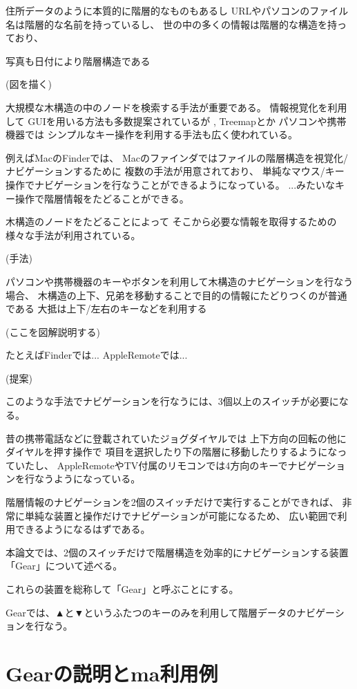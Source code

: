\documentclass[twoside]{wiss}
\def\▲{▲}
\def\▼{▼}
\begin{document}
住所データのように本質的に階層的なものもあるし
URLやパソコンのファイル名は階層的な名前を持っているし、
世の中の多くの情報は階層的な構造を持っており、

写真も日付により階層構造である

(図を描く)

大規模な木構造の中のノードを検索する手法が重要である。
情報視覚化を利用して
GUIを用いる方法も多数提案されているが
\cite{Johnson:1991:TSA:949607.949654},
  Treemapとか
パソコンや携帯機器では
シンプルなキー操作を利用する手法も広く使われている。

例えばMacのFinderでは、
Macのファインダではファイルの階層構造を視覚化/ナビゲーションするために
複数の手法が用意されており、
単純なマウス/キー操作でナビゲーションを行なうことができるようになっている。
...みたいなキー操作で階層情報をたどることができる。

木構造のノードをたどることによって
そこから必要な情報を取得するための様々な手法が利用されている。

(手法)

パソコンや携帯機器のキーやボタンを利用して木構造のナビゲーションを行なう場合、
木構造の上下、兄弟を移動することで目的の情報にたどりつくのが普通である
大抵は上下/左右のキーなどを利用する

(ここを図解説明する)

たとえばFinderでは... AppleRemoteでは...

(提案)

このような手法でナビゲーションを行なうには、3個以上のスイッチが必要になる。

昔の携帯電話などに登載されていたジョグダイヤルでは
上下方向の回転の他にダイヤルを押す操作で
項目を選択したり下の階層に移動したりするようになっていたし、
AppleRemoteやTV付属のリモコンでは4方向のキーでナビゲーションを行なうようになっている。

階層情報のナビゲーションを2個のスイッチだけで実行することができれば、
非常に単純な装置と操作だけでナビゲーションが可能になるため、
広い範囲で利用できるようになるはずである。

本論文では、2個のスイッチだけで階層構造を効率的にナビゲーションする装置「Gear」について述べる。

これらの装置を総称して「Gear」と呼ぶことにする。

Gearでは、{\▲}と{\▼}というふたつのキーのみを利用して階層データのナビゲーションを行なう。

\section{Gearの説明とma利用例}
\end{document}
